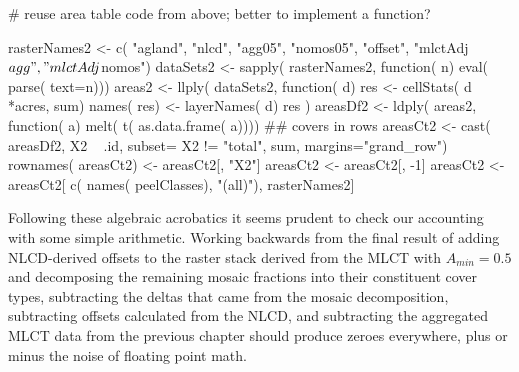



\begin{Schunk}
\begin{Sinput}
 # reuse area table code from above; better to implement a function?
 
 rasterNames2 <- c( "agland", "nlcd", "agg05", "nomos05",
                   "offset", "mlctAdj$agg", "mlctAdj$nomos")
 dataSets2 <- sapply( rasterNames2,
   function( n) eval( parse( text=n)))
 areas2 <- llply( dataSets2,
   function( d) {
     res <- cellStats( d *acres, sum)
     names( res) <- layerNames( d)
     res
   })
 areasDf2 <- ldply( areas2, function( a) melt( t( as.data.frame( a))))
 ## covers in rows
 areasCt2 <- cast( areasDf2, X2 ~ .id, subset= X2 != "total", sum, margins="grand_row")
 rownames( areasCt2) <- areasCt2[, "X2"]
 areasCt2 <- areasCt2[, -1]
 areasCt2 <- areasCt2[ c( names( peelClasses), "(all)"), rasterNames2]
 
\end{Sinput}
\end{Schunk}

Following these algebraic acrobatics it seems prudent to check our
accounting with some simple arithmetic.  Working backwards from the
final result of adding NLCD-derived offsets to the raster stack
derived from the MLCT with $A_{min}=0.5$ and decomposing the remaining
mosaic fractions into their constituent cover types, subtracting the
deltas that came from the mosaic decomposition, subtracting offsets
calculated from the NLCD, and subtracting the aggregated MLCT data
from the previous chapter 
should produce zeroes everywhere, plus or minus the noise of floating
point math.


